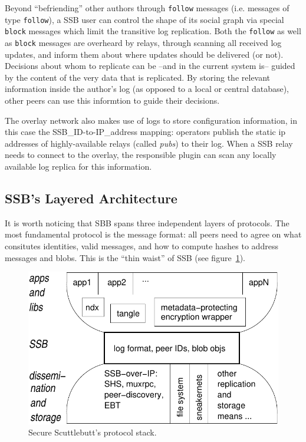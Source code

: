 \documentclass[9pt,sigconf]{acmart}
\begin{document}
Beyond ``befriending'' other authors through {\tt follow} messages (i.e. messages of type {\tt follow}), a SSB user can control the shape of its social graph via special {\tt block} messages which limit the transitive log replication. Both the {\tt follow} as well as {\tt block} messages are overheard by relays, through scanning all received log updates, and inform them about where updates should be delivered (or not). Decisions about whom to replicate can be --and in the current system is-- guided by the content of the very data that is replicated. By storing the relevant information inside the author's log (as opposed to a local or central database), other peers can use this informtion to guide their decisions.

The overlay network also makes use of logs to store configuration information, in this case the SSB\_ID-to-IP\_address mapping: operators publish the static ip addresses of highly-available relays (called {\em pubs}) to their log. When a SSB relay needs to connect to the overlay, the responsible plugin can scan any locally available log replica for this information.

\subsection*{SSB's Layered Architecture}

It is worth noticing that SBB spans three independent layers of protocols. The most fundamental protocol is the message format: all peers need to agree on what consitutes identities, valid messages, and how to compute hashes to address messages and blobs. This is the ``thin waist'' of SSB (see figure~\ref{fig:waist}).

\begin{figure}[htb]
  \includegraphics[width=0.9\columnwidth]{figs/ssb-waist.pdf}
  \caption{Secure Scuttlebutt's protocol stack.}
  \label{fig:waist}
\end{figure}
\end{document}

